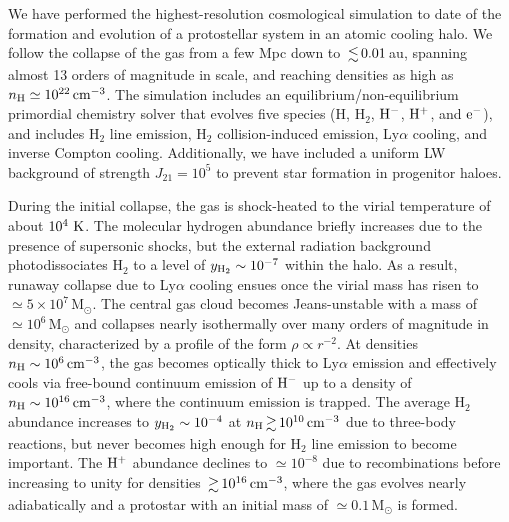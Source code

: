 \documentclass[useAMS,usenatbib]{mnras}
\newcommand{\cmmm}{\text{cm}^{-3}}
\newcommand{\HH}{\text{H}_2}          %
\newcommand{\HM}{{\rm H}^{-}}     %
\newcommand{\HP}{{\rm H}^{+}}     %
\newcommand{\e}{{\rm e}^{-}}     %
\newcommand{\nh}{n_{\rm H}}
\newcommand{\msun}{\text{M}_\odot}
\begin{document}
We have performed the highest-resolution cosmological simulation to date of the formation and evolution of a protostellar system in an atomic cooling halo. We follow the collapse of the gas from a few Mpc down to $\la 0.01\,$au, spanning almost 13 orders of magnitude in scale, and reaching densities as high as $\nh\simeq 10^{22}\,\cmmm$. The simulation includes an equilibrium/non-equilibrium primordial chemistry solver that evolves five species (H, $\HH$, $\HM$, $\HP$, and $\e$), and includes $\HH$ line emission, $\HH$ collision-induced emission, Ly$\alpha$ cooling, and inverse Compton cooling. Additionally, we have included a uniform LW background of strength $J_{21}=10^5$ to prevent star formation in progenitor haloes.

During the initial collapse, the gas is shock-heated to the virial temperature of about $10^4~{\rm K}$. The molecular hydrogen abundance briefly increases due to the presence of supersonic shocks, but the external radiation background photodissociates H$_2$ to a level of $y_{\rm H_2}\sim 10^{-7}$ within the halo. As a result, runaway collapse due to Ly$\alpha$ cooling ensues once the virial mass has risen to $\simeq 5\times 10^7\,\msun$. The central gas cloud becomes Jeans-unstable with a mass of $\simeq 10^6\,\msun$ and collapses nearly isothermally over many orders of magnitude in density, characterized by a profile of the form $\rho \propto r^{-2}$. At densities $\nh\sim 10^6\,\cmmm$, the gas becomes optically thick to Ly$\alpha$ emission and effectively cools via free-bound continuum emission of $\HM$ up to a density of $\nh\sim 10^{16}\,\cmmm$, where the continuum emission is trapped. The average $\HH$ abundance increases to $y_{\rm H_2}\sim 10^{-4}$ at $\nh\ga 10^{10}\,\cmmm$ due to three-body reactions, but never becomes high enough for H$_2$ line emission to become important. The $\HP$ abundance declines to $\simeq 10^{-8}$ due to recombinations before increasing to unity for densities $\ga 10^{16}\,\cmmm$, where the gas evolves nearly adiabatically and a protostar with an initial mass of $\simeq 0.1\,\msun$ is formed.
\end{document}
